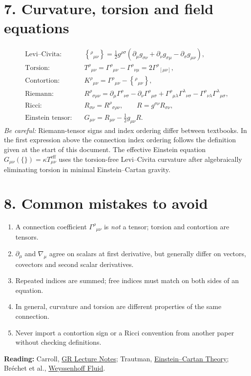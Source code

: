 \documentclass[10pt,a4paper]{article}
\begin{document}
\section*{7. Curvature, torsion and field equations}
\begin{align*}
\text{Levi--Civita:}\quad & \left\{^\rho{}_{\mu\nu}\right\}=\frac12 g^{\rho\sigma}(\partial_\mu g_{\sigma\nu}+\partial_\nu g_{\sigma\mu}-\partial_\sigma g_{\mu\nu}),\\
\text{Torsion:}\quad & T^\rho{}_{\mu\nu}=\Gamma^\rho{}_{\mu\nu}-\Gamma^\rho{}_{\nu\mu}=2\Gamma^\rho{}_{[\mu\nu]},\\
\text{Contortion:}\quad & K^\rho{}_{\mu\nu}=\Gamma^\rho{}_{\mu\nu}-\left\{^\rho{}_{\mu\nu}\right\},\\
\text{Riemann:}\quad & R^\rho{}_{\sigma\mu\nu}=\partial_\mu\Gamma^\rho{}_{\nu\sigma}-\partial_\nu\Gamma^\rho{}_{\mu\sigma}+\Gamma^\rho{}_{\mu\lambda}\Gamma^\lambda{}_{\nu\sigma}-\Gamma^\rho{}_{\nu\lambda}\Gamma^\lambda{}_{\mu\sigma},\\
\text{Ricci:}\quad & R_{\sigma\nu}=R^\rho{}_{\sigma\rho\nu},\qquad R=g^{\sigma\nu}R_{\sigma\nu},\\
\text{Einstein tensor:}\quad & G_{\mu\nu}=R_{\mu\nu}-\tfrac12 g_{\mu\nu}R.
\end{align*}
\noindent\emph{Be careful:} Riemann-tensor signs and index ordering differ between textbooks. In the first expression above the connection index ordering follows the definition given at the start of this document. The effective Einstein equation $G_{\mu\nu}(\{\})=\kappa T^{\mathrm{eff}}_{\mu\nu}$ uses the torsion-free Levi--Civita curvature after algebraically eliminating torsion in minimal Einstein--Cartan gravity.
\section*{8. Common mistakes to avoid}
\begin{enumerate}\setlength{\itemsep}{1pt}
\item A connection coefficient $\Gamma^\rho{}_{\mu\nu}$ is \emph{not} a tensor; torsion and contortion are tensors.
\item $\partial_\mu$ and $\nabla_\mu$ agree on scalars at first derivative, but generally differ on vectors, covectors and second scalar derivatives.
\item Repeated indices are summed; free indices must match on both sides of an equation.
\item In general, curvature and torsion are different properties of the same connection.
\item Never import a contortion sign or a Ricci convention from another paper without checking definitions.
\end{enumerate}
\noindent\textbf{Reading:} Carroll, \href{https://arxiv.org/abs/gr-qc/9712019}{GR Lecture Notes}; Trautman, \href{https://arxiv.org/abs/gr-qc/0606062}{Einstein--Cartan Theory}; Br\'echet et al., \href{https://arxiv.org/abs/0706.2367}{Weyssenhoff Fluid}.
\end{document}
